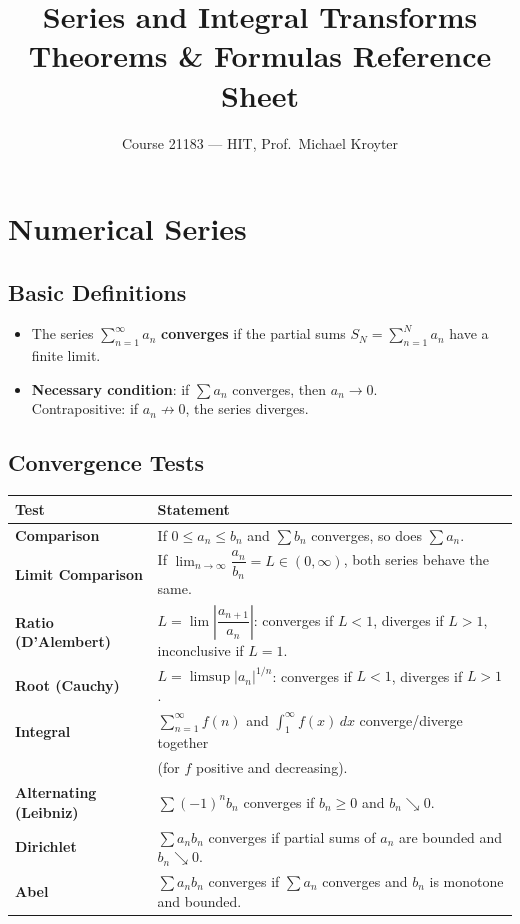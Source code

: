 \documentclass[12pt, a4paper]{article}
\title{\textbf{Series and Integral Transforms}\\[0.5em]
\large Theorems \& Formulas Reference Sheet}
\author{Course 21183 --- HIT, Prof.\ Michael Kroyter}
\date{}
\theoremstyle{definition}
\theoremstyle{remark}
\begin{document}
\maketitle
\tableofcontents
\newpage

\section{Numerical Series}

\subsection{Basic Definitions}
\begin{itemize}
  \item The series $\displaystyle\sum_{n=1}^\infty a_n$ \textbf{converges} if the partial sums
        $S_N = \sum_{n=1}^N a_n$ have a finite limit.
  \item \textbf{Necessary condition}: if $\sum a_n$ converges, then $a_n \to 0$.\\
        Contrapositive: if $a_n \not\to 0$, the series diverges.
\end{itemize}

\subsection{Convergence Tests}

\begin{center}
\begin{tabular}{>{\bfseries}lp{10cm}}
\toprule
Test & Statement \\
\midrule
Comparison & If $0 \le a_n \le b_n$ and $\sum b_n$ converges, so does $\sum a_n$. \\[6pt]
Limit Comparison & If $\lim_{n\to\infty} \dfrac{a_n}{b_n} = L \in (0,\infty)$, both series behave the same. \\[6pt]
Ratio (D'Alembert) & $L = \lim \left|\dfrac{a_{n+1}}{a_n}\right|$: converges if $L<1$, diverges if $L>1$, inconclusive if $L=1$. \\[6pt]
Root (Cauchy) & $L = \limsup |a_n|^{1/n}$: converges if $L<1$, diverges if $L>1$. \\[6pt]
Integral & $\sum_{n=1}^\infty f(n)$ and $\int_1^\infty f(x)\,dx$ converge/diverge together\\
         & (for $f$ positive and decreasing). \\[6pt]
Alternating (Leibniz) & $\sum (-1)^n b_n$ converges if $b_n \ge 0$ and $b_n \searrow 0$. \\[6pt]
Dirichlet & $\sum a_n b_n$ converges if partial sums of $a_n$ are bounded and $b_n \searrow 0$. \\[6pt]
Abel & $\sum a_n b_n$ converges if $\sum a_n$ converges and $b_n$ is monotone and bounded. \\
\bottomrule
\end{tabular}
\end{center}
\end{document}
